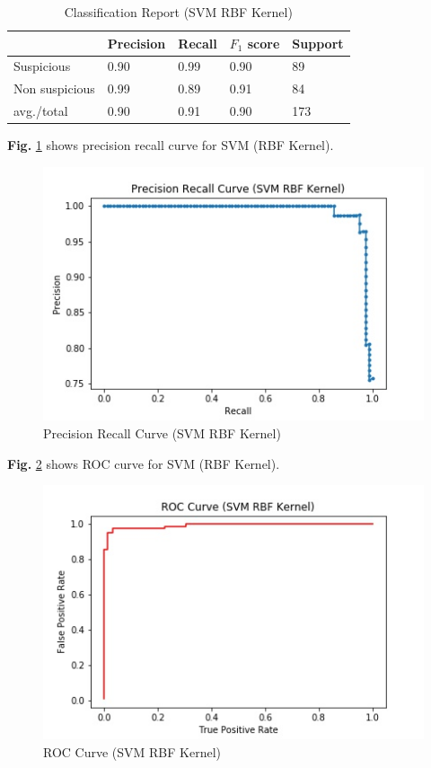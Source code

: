 \begin{table}[h!]
\begin{center}
\caption{Classification Report (SVM RBF Kernel)}
\begin{tabular}{|m{4.4cm} | m{2cm}| m{2cm}| m{2cm}| m{2cm}|}
\hline
     & Precision & Recall & $F_1$ score & Support \\
\hline
     Suspicious & 0.90 & 0.99 & 0.90 & 89\\
\hline 
     Non suspicious  & 0.99 & 0.89 & 0.91 & 84\\
\hline 
     avg./total & 0.90 & 0.91 & 0.90 & 173\\
\hline
\end{tabular}
\end{center}
\end{table}

\noindent
\textbf{Fig.} \ref{fig:prsk} shows precision recall curve for SVM (RBF Kernel).

\begin{figure}[h!]
    \centering
    \includegraphics[scale=0.58]{Figures/PRSK.jpg}
    \caption{Precision Recall Curve (SVM RBF Kernel)}
    \label{fig:prsk}
\end{figure}

\noindent
\textbf{Fig.} \ref{fig:rocsk} shows ROC curve for SVM (RBF Kernel).

\begin{figure}[h!]
    \centering
    \includegraphics[scale=0.58]{Figures/ROCSK.jpg}
    \caption{ROC Curve (SVM RBF Kernel)}
    \label{fig:rocsk}
\end{figure}

